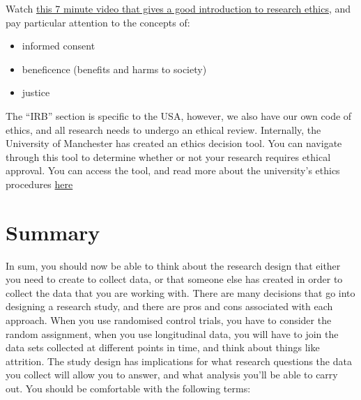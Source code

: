 \documentclass[
]{book}
\providecommand{\tightlist}{%
  \setlength{\itemsep}{0pt}\setlength{\parskip}{0pt}}
\begin{document}
Watch \href{https://www.youtube.com/watch?v=Zbi7nIbAuMQ}{this 7 minute video that gives a good introduction to research ethics}, and pay particular attention to the concepts of:

\begin{itemize}
\tightlist
\item
  informed consent
\item
  beneficence (benefits and harms to society)
\item
  justice
\end{itemize}

The ``IRB'' section is specific to the USA, however, we also have our own code of ethics, and all research needs to undergo an ethical review. Internally, the University of Manchester has created an ethics decision tool. You can navigate through this tool to determine whether or not your research requires ethical approval. You can access the tool, and read more about the university's ethics procedures \href{https://www.manchester.ac.uk/research/environment/governance/ethics/}{here}

\hypertarget{summary-4}{%
\section{Summary}\label{summary-4}}

In sum, you should now be able to think about the research design that either you need to create to collect data, or that someone else has created in order to collect the data that you are working with. There are many decisions that go into designing a research study, and there are pros and cons associated with each approach. When you use randomised control trials, you have to consider the random assignment, when you use longitudinal data, you will have to join the data sets collected at different points in time, and think about things like attrition. The study design has implications for what research questions the data you collect will allow you to answer, and what analysis you'll be able to carry out. You should be comfortable with the following terms:
\end{document}
